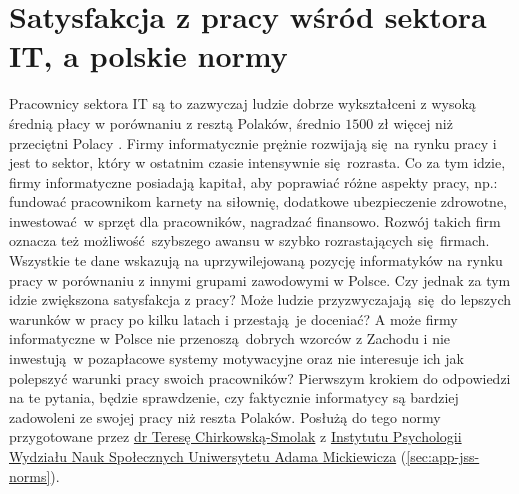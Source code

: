 \section{Satysfakcja z pracy wśród sektora IT, a polskie normy}
\label{sec:hip-sat-norms}
Pracownicy sektora IT są to zazwyczaj ludzie dobrze wykształceni z wysoką średnią płacy w porównaniu z resztą Polaków, średnio $1500$ zł więcej niż przeciętni Polacy \cite{web:earnings-it,web:earnings-pl}. Firmy informatycznie prężnie rozwijają się na rynku pracy i jest to sektor, który w ostatnim czasie intensywnie się rozrasta. Co za tym idzie, firmy informatyczne posiadają kapitał, aby poprawiać różne aspekty pracy, np.: fundować pracownikom karnety na siłownię, dodatkowe ubezpieczenie zdrowotne, inwestować w sprzęt dla pracowników, nagradzać
finansowo. Rozwój takich firm oznacza też możliwość szybszego awansu w szybko rozrastających się firmach. Wszystkie te dane wskazują na uprzywilejowaną pozycję informatyków na rynku pracy w porównaniu z innymi grupami zawodowymi w Polsce. Czy jednak za tym idzie zwiększona satysfakcja z pracy? Może ludzie przyzwyczajają się do lepszych warunków w pracy po kilku latach i przestają je doceniać? A może firmy informatyczne w Polsce nie
przenoszą dobrych wzorców z Zachodu i nie inwestują w pozapłacowe systemy motywacyjne oraz nie interesuje ich jak polepszyć warunki pracy swoich pracowników? Pierwszym krokiem do odpowiedzi na te pytania, będzie sprawdzenie, czy faktycznie informatycy są bardziej zadowoleni ze swojej pracy niż reszta Polaków. Posłużą do tego normy przygotowane przez
\href{http://www.psychologia.amu.edu.pl/ip-uam/struktura-zatrudnienia-w-instytucie/curriculum-vitae-teresa-chirkowska-smolak/}{dr Teresę Chirkowską-Smolak} z \href{http://www.psychologia.amu.edu.pl/}{Instytutu Psychologii Wydziału Nauk Społecznych Uniwersytetu Adama Mickiewicza} (\ref{sec:app-jss-norms}).

